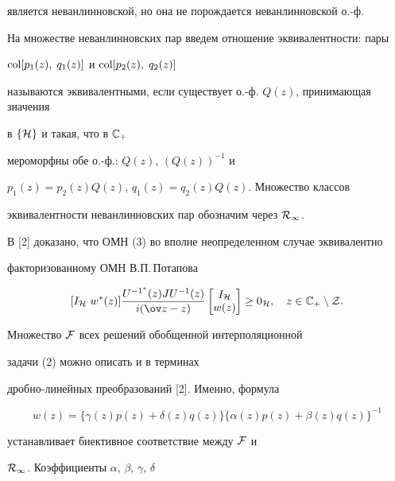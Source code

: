 является неванлинновской, но она не порождается неванлинновской о.-ф.





На множестве неванлинновских пар введем отношение эквивалентности: пары


$\operatorname{col}[p_1(z),\; q_1(z)]$ и $\operatorname{col}[p_2(z),\; q_2(z)] $


называются эквивалентными, если существует о.-ф. $Q(z)$, принимающая значения


в $\{{\cal H}\}$ и такая, что в ${\Bbb C}_+$


мероморфны обе о.-ф.: $Q(z)$, $(Q(z))^{-1}$ и


$p_1(z)=p_2(z)Q(z)$, $q_1(z)=q_2(z)Q(z)$. Множество классов


эквивалентности неванлинновских пар обозначим через ${\cal R}_\infty $.





В [2] доказано, что ОМН (3) во вполне неопределенном случае эквивалентно


факторизованному ОМН В.П.\,Потапова


\begin{equation}


[ I_{\cal H}\ w^*(z) ] \frac {U^{-1^*}(z)J


U^{-1}(z)}{i(\ov z-z)}


\begin{bmatrix} I_{\cal H} \\ w(z) \end{bmatrix}


\geq 0_{\cal H},\quad z\in {\Bbb C}_{+} \setminus {\cal Z}.


\end{equation}





Множество ${\cal F}$ всех решений обобщенной интерполяционной


задачи (2) можно описать и в терминах


дробно-линейных преобразований [2]. Именно, формула


$$


w(z)=\{\gamma (z)p(z)+\delta (z)q(z) \}


\{ \alpha (z)p(z)+ \beta (z)q(z)\}^{-1}


$$


устанавливает биективное соответствие между ${\cal F}$ и


${\cal R}_\infty $. Коэффициенты $\alpha$, $\beta$, $\gamma$, $\delta$


